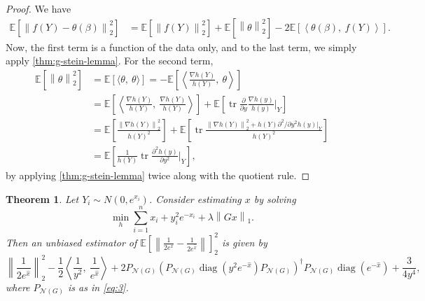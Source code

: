 \documentclass[11pt]{article}
\newcommand{\norm}[1]{\left\lVert #1 \right\rVert}
\newcommand{\E}{\mathbb{E}}
\newcommand{\Expect}[1]{\E\left[#1\right]}
\renewcommand{\hat}{\widehat}
\DeclareMathOperator*{\trace}{tr}
\DeclareMathOperator*{\diag}{diag}
\newcommand{\Pnd}{P_{\mathcal{N}(G)}}
\theoremstyle{plain}
\newtheorem{theorem}{Theorem}
\begin{document}
\begin{proof}
  We have
  \begin{align}
    \label{eq:14}
    \Expect{\norm{f(Y) - \theta(\beta)}_2^2} 
    &= \Expect{\norm{f(Y)}_2^2} + \Expect{\norm{\theta}_2^2} -
      2\Expect{\left\langle \theta(\beta),\ f(Y)\right\rangle}.
  \end{align}
  Now, the first term is a function of the data only, and to the last term, we simply apply
  \autoref{thm:g-stein-lemma}. For the second term,
  \begin{align}
    \Expect{\norm{\theta}_2^2} 
    &=\Expect{\langle \theta,\ \theta \rangle}
     = -\Expect{\left\langle\frac{\nabla h(Y)}{h(Y)},\ \theta\right\rangle}\\ 
    &= \Expect{\left\langle\frac{\nabla h(Y)}{h(Y)},\
      \frac{\nabla h(Y)}{h(Y)}\right\rangle} + \Expect{\trace
      \frac{\partial}{\partial y} \frac{\nabla h(y)}{h(y)}
      \bigg\vert_Y}\\
    &= \Expect{\frac{\norm{\nabla h(Y)}_2^2}{h(Y)^2}} + \Expect{\trace
      \frac{\norm{\nabla h(Y)}_2^2 +h(Y) \partial^2/\partial y^2 h(y)\big\vert_Y} 
      {h(Y)^2}}\\ 
    &=\Expect{ \frac{1}{h(Y)} \trace \frac{\partial^2 h(y)}{\partial y^2}\bigg\vert_Y},
  \end{align}
  by applying \autoref{thm:g-stein-lemma} twice along with the
  quotient rule.
\end{proof}

\begin{theorem}
  Let $Y_i \sim N(0, e^{x_i})$. Consider estimating $x$ by solving
  \begin{equation}
    \label{eq:15}
    \min_h \sum_{i=1}^n x_i + y_i^2e^{-x_i} + \lambda \norm{Gx}_1.
  \end{equation}
  Then an unbiased estimator of $\Expect{\norm{\frac{1}{2e^x} -
      \frac{1}{2e^{\hat x}}}}_2^2$ is given by
  \begin{equation}
    \label{eq:16}
    \norm{\frac{1}{2e^{\hat x}}}_2^2 - \frac{1}{2}\left\langle
      \frac{1}{y^2},\ \frac{1}{e^{\hat x}}\right\rangle + 2 \Pnd \left(\Pnd
      \diag\left(y^2e^{-\hat x}\right) \Pnd\right)^\dagger \Pnd
      \diag\left( e^{-\hat x}\right) + \frac{3}{4y^4},
  \end{equation}
where $\Pnd$ is as in \eqref{eq:3}.
\end{theorem}
\end{document}

